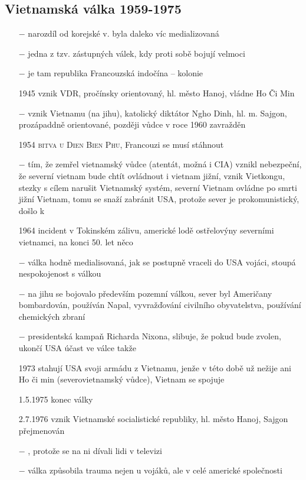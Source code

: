 \documentclass{article}
\begin{document}
\subsection*{Vietnamská válka 1959-1975}
\begin{itemize}
    \vspace{-0.5em}
    \setlength\itemsep{0.15em}
    \item[$-$] narozdíl od korejské v. byla daleko víc medializovaná
    \item[$-$] jedna z tzv. zástupných válek, kdy proti sobě bojují velmoci
    \item[$-$] je tam republika Francouzská indočína -- kolonie
    \item[1945] vznik VDR, pročínsky orientovaný, hl. město Hanoj, vládne Ho Či Min
    \item[$-$] vznik Vietnamu (na jihu), katolický diktátor Ngho Dinh, hl. m. Sajgon, prozápaddně orientované, později vůdce v roce 1960 zavražděn
    \item[1954] \textsc{bitva u Dien Bien Phu}, Francouzi se musí stáhnout
    \item[$-$] tím, že zemřel vietnamský vůdce (atentát, možná i CIA) vznikl nebezpeční, že severní vietnam bude chtít ovládnout i vietnam jižní, vznik Vietkongu, stezky s cílem narušit Vietnamský systém, severní Vietnam ovládne po smrti jižní Vietnam, tomu se snaží zabránit USA, protože sever je prokomunistický, došlo k
    \item[1964] incident v Tokinském zálivu, americké lodě ostřelovýny severními vietnamci, na konci 50. let něco
    \item[$-$] válka hodně medialisovaná, jak se postupně vraceli do USA vojáci, stoupá nespokojenost s válkou
    \item[$-$] na jihu se bojovalo především pozemní válkou, sever byl Američany bombardován, používán Napal, vyvražďování civilního obyvatelstva, používání chemických zbraní
    \item[$-$] presidentská kampaň Richarda Nixona, slibuje, že pokud bude zvolen, ukončí USA účast ve válce takže
    \item[1973] stahují USA svoji armádu z Vietnamu, jenže v této době už nežije ani Ho či min (severovietnamský vůdce), Vietnam se spojuje
    \item[1.5.1975] konec války
    \item[2.7.1976] vznik Vietnamské socialistické republiky, hl. město Hanoj, Sajgon přejmenován
    \item[$-$] , protože se na ni dívali lidi v televizi
    \item[$-$] válka způsobila trauma nejen u vojáků, ale v celé americké společnosti
\end{itemize}
\end{document}
